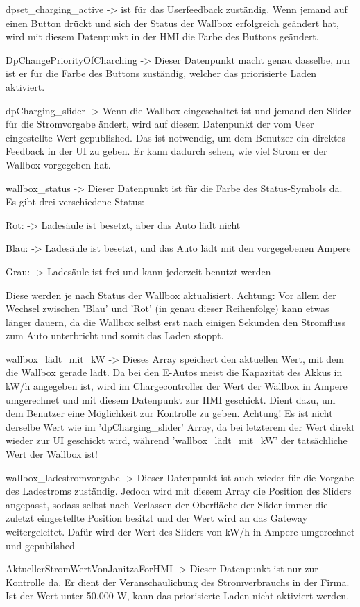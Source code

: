 \begin{compactitem}
\item dpset\_charging\_active -> ist für das Userfeedback zuständig. Wenn jemand auf einen Button drückt und sich der Status der Wallbox erfolgreich geändert hat, wird mit diesem Datenpunkt in der HMI die Farbe des Buttons geändert.
\item DpChangePriorityOfCharching -> Dieser Datenpunkt macht genau dasselbe, nur ist er für die Farbe des Buttons zuständig, welcher das priorisierte Laden aktiviert.
\item dpCharging\_slider -> Wenn die Wallbox eingeschaltet ist und jemand den Slider für die Stromvorgabe ändert, wird auf diesem Datenpunkt der vom User eingestellte Wert gepublished. Das ist notwendig, um dem Benutzer ein direktes Feedback in der UI zu geben. Er kann dadurch sehen, wie viel Strom er der Wallbox vorgegeben hat.
\item wallbox\_status -> Dieser Datenpunkt ist für die Farbe des Status-Symbols da. Es gibt drei verschiedene Status:
\begin{compactitem}
\item Rot: -> Ladesäule ist besetzt, aber das Auto lädt nicht
\item Blau: -> Ladesäule ist besetzt, und das Auto lädt mit den vorgegebenen Ampere
\item Grau: -> Ladesäule ist frei und kann jederzeit benutzt werden
\end{compactitem}
Diese werden je nach Status der Wallbox aktualisiert. Achtung: Vor allem der Wechsel zwischen 'Blau' und 'Rot' (in genau dieser Reihenfolge) kann etwas länger dauern, da die Wallbox selbst erst nach einigen Sekunden den Stromfluss zum Auto unterbricht und somit das Laden stoppt.


\item wallbox\_lädt\_mit\_kW -> Dieses Array speichert den aktuellen Wert, mit dem die Wallbox gerade lädt. Da bei den E-Autos meist die Kapazität des Akkus in kW/h angegeben ist, wird im Chargecontroller der Wert der Wallbox in Ampere umgerechnet und mit diesem Datenpunkt zur HMI geschickt. Dient dazu, um dem Benutzer eine Möglichkeit zur Kontrolle zu geben. Achtung! Es ist nicht derselbe Wert wie im 'dpCharging\_slider' Array, da bei letzterem der Wert direkt wieder zur UI geschickt wird, während 'wallbox\_lädt\_mit\_kW' der tatsächliche Wert der Wallbox ist!
\item wallbox\_ladestromvorgabe -> Dieser Datenpunkt ist auch wieder für die Vorgabe des Ladestroms zuständig. Jedoch wird mit diesem Array die Position des Sliders angepasst, sodass selbst nach Verlassen der Oberfläche der Slider immer die zuletzt eingestellte Position besitzt und der Wert wird an das Gateway weitergeleitet. Dafür wird der Wert des Sliders von kW/h in Ampere umgerechnet und gepubilshed
\item AktuellerStromWertVonJanitzaForHMI -> Dieser Datenpunkt ist nur zur Kontrolle da. Er dient der Veranschaulichung des Stromverbrauchs in der Firma. Ist der Wert unter 50.000 W, kann das priorisierte Laden nicht aktiviert werden.
\end{compactitem}


